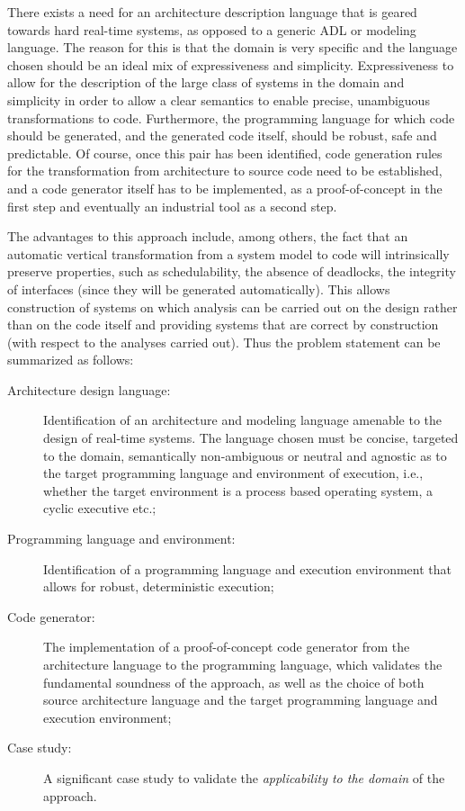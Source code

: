 There exists a need for an architecture description language that is
geared towards hard real-time systems, as opposed to a generic ADL or
modeling language. The reason for this is that the domain is very
specific and the language chosen should be an ideal mix of
expressiveness and simplicity. Expressiveness to allow for the
description of the large class of systems in the domain and simplicity
in order to allow a clear semantics to enable precise, unambiguous
transformations to code. Furthermore, the programming language for
which code should be generated, and the generated code itself, should
be robust, safe and predictable. Of course, once this pair has been
identified, code generation rules for the transformation from
architecture to source code need to be established, and a code
generator itself has to be implemented, as a proof-of-concept in the
first step and eventually an industrial tool as a second step.

The advantages to this approach include, among others, the fact that
an automatic vertical transformation from a system model to code will
intrinsically preserve properties, such as schedulability, the absence
of deadlocks, the integrity of interfaces (since they will be
generated automatically). This allows construction of systems on which
analysis can be carried out on the design rather than on the code
itself and providing systems that are correct by construction (with
respect to the analyses carried out). Thus the problem statement can
be summarized as follows:

\begin{description}
\item[Architecture design language:]{Identification of an architecture
  and modeling language amenable to the design of real-time
  systems. The language chosen must be concise, targeted to the
  domain, semantically non-ambiguous or neutral and agnostic as to the
  target programming language and environment of execution, i.e.,
  whether the target environment is a process based operating system,
  a cyclic executive etc.;}
\item[Programming language and environment:]{Identification of a
  programming language and execution environment that allows for
  robust, deterministic execution;}
\item[Code generator:]{The implementation of a proof-of-concept code
  generator from the architecture language to the programming
  language, which validates the fundamental soundness of the approach,
  as well as the choice of both source architecture language and the
  target programming language and execution environment;}
\item[Case study:]{A significant case study to validate the
  \emph{applicability to the domain} of the approach.}
\end{description}

